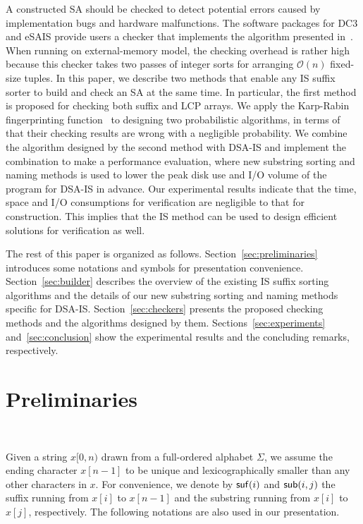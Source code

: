 \documentclass[10pt,journal,compsoc]{IEEEtran}
\begin{document}
A constructed SA should be checked to detect potential errors caused by implementation bugs and hardware malfunctions. The software packages for DC3 and eSAIS provide users a checker that implements the algorithm presented in~\cite{Dementiev2008a}. When running on external-memory model, the checking overhead is rather high because this checker takes two passes of integer sorts for arranging $\mathcal{O}(n)$ fixed-size tuples. In this paper, we describe two methods that enable any IS suffix sorter to build and check an SA at the same time. In particular, the first method is proposed for checking both suffix and LCP arrays. We apply the Karp-Rabin fingerprinting function~\cite{Karp1987} to designing two probabilistic algorithms, in terms of that their checking results are wrong with a negligible probability. We combine the algorithm designed by the second method with DSA-IS and implement the combination to make a performance evaluation, where new substring sorting and naming methods is used to lower the peak disk use and I/O volume of the program for DSA-IS in advance. Our experimental results indicate that the time, space and I/O consumptions for verification are negligible to that for construction. This implies that the IS method can be used to design efficient solutions for verification as well.

The rest of this paper is organized as follows. Section~\ref{sec:preliminaries} introduces some notations and symbols for presentation convenience. Section~\ref{sec:builder} describes the overview of the existing IS suffix sorting algorithms and the details of our new substring sorting and naming methods specific for DSA-IS. Section~\ref{sec:checkers} presents the proposed checking methods and the algorithms designed by them. Sections~\ref{sec:experiments} and~\ref{sec:conclusion} show the experimental results and the concluding remarks, respectively.

\section{Preliminaries}~\label{sec:preliminaries}

Given a string $x[0,n)$ drawn from a full-ordered alphabet $\Sigma$, we assume the ending character $x[n - 1]$ to be unique and lexicographically smaller than any other characters in $x$. For convenience, we denote by ${\sf suf}(i)$ and ${\sf sub}(i, j)$ the suffix running from $x[i]$ to $x[n-  1]$ and the substring running from $x[i]$ to $x[j]$, respectively. The following notations are also used in our presentation.
\end{document}
